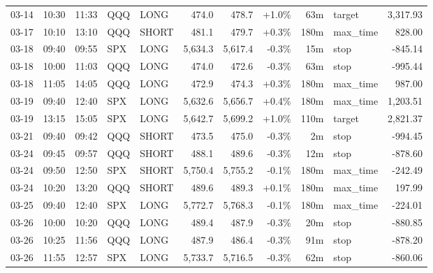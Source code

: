 \documentclass[11pt,a4paper,twoside]{article}
\begin{document}
\begin{center}
\begin{longtable}{>{\color{txtmain}}l l l l l r r r r >{\color{txtmain}}l r}
03-14 & 10:30 & 11:33 & QQQ & LONG & 474.0 & 478.7 & \textcolor{wingreen}{+1.0\%} & 63m & target & \textcolor{wingreen}{3,317.93} \\
03-17 & 10:10 & 13:10 & QQQ & SHORT & 481.1 & 479.7 & \textcolor{wingreen}{+0.3\%} & 180m & max\_time & \textcolor{wingreen}{828.00} \\
03-18 & 09:40 & 09:55 & SPX & LONG & 5,634.3 & 5,617.4 & \textcolor{lossred}{-0.3\%} & 15m & stop & \textcolor{lossred}{-845.14} \\
03-18 & 10:00 & 11:03 & QQQ & LONG & 474.0 & 472.6 & \textcolor{lossred}{-0.3\%} & 63m & stop & \textcolor{lossred}{-995.44} \\
03-18 & 11:05 & 14:05 & QQQ & LONG & 472.9 & 474.3 & \textcolor{wingreen}{+0.3\%} & 180m & max\_time & \textcolor{wingreen}{987.00} \\
03-19 & 09:40 & 12:40 & SPX & LONG & 5,632.6 & 5,656.7 & \textcolor{wingreen}{+0.4\%} & 180m & max\_time & \textcolor{wingreen}{1,203.51} \\
03-19 & 13:15 & 15:05 & SPX & LONG & 5,642.7 & 5,699.2 & \textcolor{wingreen}{+1.0\%} & 110m & target & \textcolor{wingreen}{2,821.37} \\
03-21 & 09:40 & 09:42 & QQQ & SHORT & 473.5 & 475.0 & \textcolor{lossred}{-0.3\%} & 2m & stop & \textcolor{lossred}{-994.45} \\
03-24 & 09:45 & 09:57 & QQQ & SHORT & 488.1 & 489.6 & \textcolor{lossred}{-0.3\%} & 12m & stop & \textcolor{lossred}{-878.60} \\
03-24 & 09:50 & 12:50 & SPX & SHORT & 5,750.4 & 5,755.2 & \textcolor{lossred}{-0.1\%} & 180m & max\_time & \textcolor{lossred}{-242.49} \\
03-24 & 10:20 & 13:20 & QQQ & SHORT & 489.6 & 489.3 & \textcolor{wingreen}{+0.1\%} & 180m & max\_time & \textcolor{wingreen}{197.99} \\
03-25 & 09:40 & 12:40 & SPX & LONG & 5,772.7 & 5,768.3 & \textcolor{lossred}{-0.1\%} & 180m & max\_time & \textcolor{lossred}{-224.01} \\
03-26 & 10:00 & 10:20 & QQQ & LONG & 489.4 & 487.9 & \textcolor{lossred}{-0.3\%} & 20m & stop & \textcolor{lossred}{-880.85} \\
03-26 & 10:25 & 11:56 & QQQ & LONG & 487.9 & 486.4 & \textcolor{lossred}{-0.3\%} & 91m & stop & \textcolor{lossred}{-878.20} \\
03-26 & 11:55 & 12:57 & SPX & LONG & 5,733.7 & 5,716.5 & \textcolor{lossred}{-0.3\%} & 62m & stop & \textcolor{lossred}{-860.06} \\

\end{longtable}
\end{center}
\end{document}
